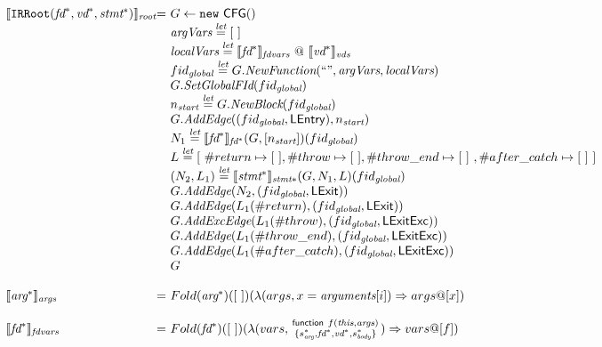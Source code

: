 \[
\begin{array}{l@{}l@{~}l}

\transfun{\TT{IRRoot}(\emph{fd}^*, \emph{vd}^*, \emph{stmt}^*)}_{\emph{root}} & = &
	G \leftarrow \TT{new}\ \CFG{\tt()}\\
	& & \argVars \letval [\ ] \\
	& & \localVars \letval \transfun{\emph{fd}^*}_{\emph{fdvars}} ~@~ \transfun{\emph{vd}^*}_{\emph{vds}} \\
	& & fid_{\emph{global}} \letval G.\emph{NewFunction}(`` ", \argVars, \localVars)\\
	& & G.\emph{SetGlobalFId}(fid_{\emph{global}}) \\
	& & n_{\emph{start}} \letval G.\emph{NewBlock}(fid_{\emph{global}})\\
	& & G.\emph{AddEdge}((fid_{\emph{global}},\LEntry), n_{\emph{start}})\\
	& & N_1 \letval \transfun{\emph{fd}^*}_{\emph{fd}^*}(G,[n_{\emph{start}}])(fid_{\emph{global}})\\
	& & L \letval [\ \#return \mapsto [\ ], \#throw \mapsto [\ ] , \#throw\_end \mapsto [\ ]\ , \#after\_catch \mapsto [\ ]\ ] \\
	& & (N_2,L_1) \letval \transfun{\emph{stmt}^*}_{\emph{stmt}*}(G,N_1,L)(fid_{\emph{global}})\\
	& & G.\emph{AddEdge}(N_2,(fid_{\emph{global}},\LExit))\\
	& & G.\emph{AddEdge}(L_1(\#return),(fid_{\emph{global}},\LExit))\\
	& & G.\emph{AddExcEdge}(L_1(\#throw),(fid_{\emph{global}},\LExitExc))\\
	& & G.\emph{AddEdge}(L_1(\#throw\_end),(fid_{\emph{global}},\LExitExc))\\
	& & G.\emph{AddEdge}(L_1(\#after\_catch),(fid_{\emph{global}},\LExitExc))\\
	& & G\\
	& & \\

\transfun{\emph{arg}^*}_{\emph{args}} & = &
	Fold(\emph{arg}^*)([\ ])(\lambda(args, x = \emph{arguments}[i])\Rightarrow args @ [x])\\
	& & \\

\transfun{\emph{fd}^*}_{\emph{fdvars}} & = &
	Fold(\emph{fd}^*)([\ ])(\lambda(vars, \irfundeclsmall{f}{\emph{this}}{\emph{args}}{s_{\emph{arg}}^*}{\emph{fd}^*}{\emph{vd}^*}{s_{\emph{body}}^*})\Rightarrow vars @ [f])\\
	& & \\


\end{array}\]
